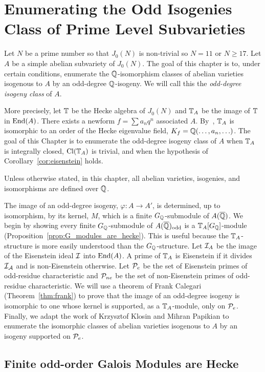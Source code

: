 \documentclass[thesis.tex]{subfiles}
\begin{document}
    
\chapter{Enumerating the Odd Isogenies Class of Prime Level Subvarieties}%
\label{chap:isogeny_class}

Let $N$ be a prime number so that $J_0(N)$ is non-trivial so $N=11$ or $N\geq
17$. Let $A$ be a simple abelian subvariety of $J_0(N)$. The goal of this
chapter is to, under certain conditions, enumerate the $\QQ$-isomorphism
classes of abelian varieties isogenous to $A$ by an odd-degree $\QQ$-isogeny.
We will call this the \emph{odd-degree isogeny class} of $A$.

More precisely, let $\TT$ be the Hecke algebra of $J_0(N)$ and $\TT_A$ be the
image of $\TT$ in $\End(A)$. There exists a newform $f=\sum a_n q^n$ associated
$A$. By~\cite[Prop. 7.14]{shimura:intro}, $\TT_A$ is isomorphic to an order of
the Hecke eigenvalue field, $K_f=\QQ(\ldots,a_n,\ldots)$. The goal of this
Chapter is to enumerate the odd-degree isogeny class of $A$ when $\TT_A$ is
integrally closed, $\Cl(\TT_A)$ is trivial, and when the hypothesis of
Corollary~\ref{cor:eisenstein} holds.

Unless otherwise stated, in this chapter, all abelian varieties, isogenies, and
isomorphisms are defined over $\QQ$.

The image of an odd-degree isogeny, $\varphi:A\to A'$, is determined, up to
isomorphism, by its kernel, $M$, which is a finite $G_\QQ$-submodule of $A(\QQbar)$.
We begin by showing every finite $G_\QQ$-submodule of $A(\QQbar)_\odd$ is a
$\TT_A[G_\QQ]$-module (Proposition~\ref{prop:G_modules_are_hecke}). This is
useful because the $\TT_A$-structure is more easily understood than the
$G_\QQ$-structure. Let $\I_A$ be the image of the Eisenstein ideal $\I$ into
$\End(A)$. A prime of $\TT_A$ is Eisenstein if it divides $\I_\A$ and is
non-Eisenstein otherwise. Let $\P_e$ be the set of Eisenstein primes of
odd-residue characteristic and $\P_{ne}$ be the set of non-Eisenstein primes of
odd-residue characteristic. We will use a theorem of Frank Calegari
(Theorem~\ref{thm:frank}) to prove that the image of an odd-degree isogeny is
isomorphic to one whose kernel is supported, as a $\TT_A$-module, only on
$\P_e$. Finally, we adapt the work of Krzysztof Klosin and Mihran Papikian to
enumerate the isomorphic classes of abelian varieties isogenous to $A$ by an
isogeny supported on $\P_e$.

\section{Finite odd-order Galois Modules are Hecke}%
\label{sec:finite_odd_order_galois_modules_are_hecke}
\end{document}
